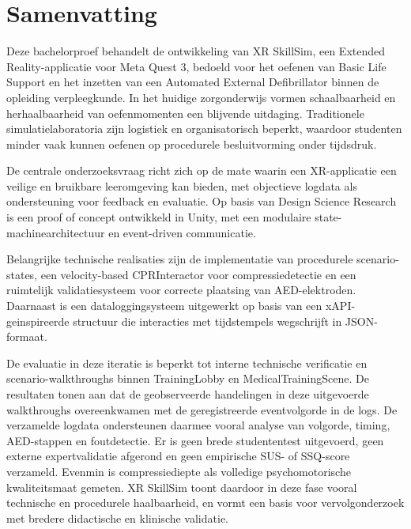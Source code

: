 


\chapter*{Samenvatting}

Deze bachelorproef behandelt de ontwikkeling van XR SkillSim, een Extended Reality-applicatie voor Meta Quest 3, bedoeld voor het oefenen van Basic Life Support en het inzetten van een Automated External Defibrillator binnen de opleiding verpleegkunde. In het huidige zorgonderwijs vormen schaalbaarheid en herhaalbaarheid van oefenmomenten een blijvende uitdaging. Traditionele simulatielaboratoria zijn logistiek en organisatorisch beperkt, waardoor studenten minder vaak kunnen oefenen op procedurele besluitvorming onder tijdsdruk.


De centrale onderzoeksvraag richt zich op de mate waarin een XR-applicatie een veilige en bruikbare leeromgeving kan bieden, met objectieve logdata als ondersteuning voor feedback en evaluatie. Op basis van Design Science Research is een proof of concept ontwikkeld in Unity, met een modulaire state-machinearchitectuur en event-driven communicatie.

Belangrijke technische realisaties zijn de implementatie van procedurele scenario-states, een velocity-based CPRInteractor voor compressiedetectie en een ruimtelijk validatiesysteem voor correcte plaatsing van AED-elektroden. Daarnaast is een dataloggingsysteem uitgewerkt op basis van een xAPI-geinspireerde structuur die interacties met tijdstempels wegschrijft in JSON-formaat.

De evaluatie in deze iteratie is beperkt tot interne technische verificatie en scenario-walkthroughs binnen TrainingLobby en MedicalTrainingScene. De resultaten tonen aan dat de geobserveerde handelingen in deze uitgevoerde walkthroughs overeenkwamen met de geregistreerde eventvolgorde in de logs. De verzamelde logdata ondersteunen daarmee vooral analyse van volgorde, timing, AED-stappen en foutdetectie. Er is geen brede studententest uitgevoerd, geen externe expertvalidatie afgerond en geen empirische SUS- of SSQ-score verzameld. Evenmin is compressiediepte als volledige psychomotorische kwaliteitsmaat gemeten. XR SkillSim toont daardoor in deze fase vooral technische en procedurele haalbaarheid, en vormt een basis voor vervolgonderzoek met bredere didactische en klinische validatie.